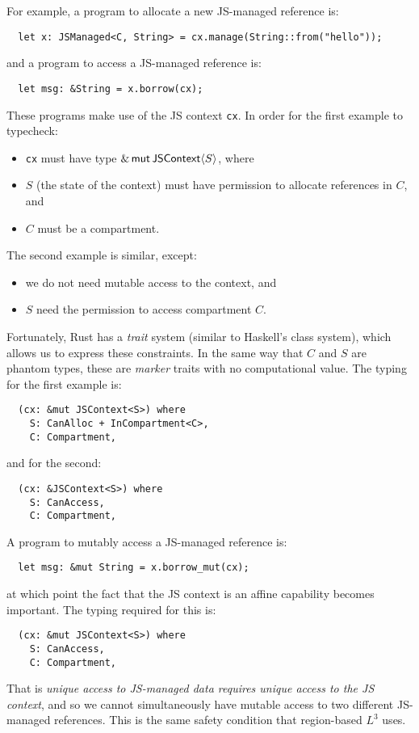 For example, a program to allocate a new JS-managed reference is:
\begin{verbatim}
  let x: JSManaged<C, String> = cx.manage(String::from("hello"));
\end{verbatim}
and a program to access a JS-managed reference is:
\begin{verbatim}
  let msg: &String = x.borrow(cx);
\end{verbatim}
These programs make use of the JS context \verb|cx|. In order for the
first example to typecheck:
\begin{itemize}

\item \verb|cx| must have type $\&\,\mathsf{mut}\,\mathsf{JSContext}\langle S\rangle$, where
\item $S$ (the state of the context) must have permission to allocate
  references in $C$, and
\item $C$ must be a compartment.

\end{itemize}
The second example is similar, except:
\begin{itemize}

\item we do not need mutable access to the context, and
\item $S$ need the permission to access compartment $C$.

\end{itemize}
Fortunately, Rust has a \emph{trait} system (similar to Haskell's
class system), which allows us to express these constraints.  In the
same way that $C$ and $S$ are phantom types, these are \emph{marker}
traits with no computational value. The typing for
the first example is:
\begin{verbatim}
  (cx: &mut JSContext<S>) where
    S: CanAlloc + InCompartment<C>,
    C: Compartment,
\end{verbatim}
and for the second:
\begin{verbatim}
  (cx: &JSContext<S>) where
    S: CanAccess,
    C: Compartment,
\end{verbatim}
A program to mutably access a JS-managed reference is:
\begin{verbatim}
  let msg: &mut String = x.borrow_mut(cx);
\end{verbatim}
at which point the fact that the JS context is an affine capability
becomes important. The typing required for this is:
\begin{verbatim}
  (cx: &mut JSContext<S>) where
    S: CanAccess,
    C: Compartment,
\end{verbatim}
That is \emph{unique access to JS-managed data requires unique access to the JS context},
and so we cannot simultaneously have mutable access to two different JS-managed
references. This is the same safety condition that region-based $L^3$ uses.

